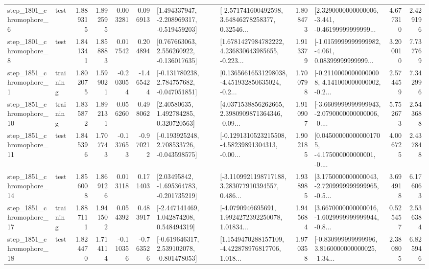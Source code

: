 \begin{tabular}{llrrrrllrlrr}
  step\_1801\_chromophore\_6 &      test &      1.889315 &    1.892595 &      0.003281 &  0.096913 &   [1.494337947, -2.208969317, -0.519459203] &  [-2.571741600492598, 3.64846278258377, 0.32546... &       1.808473 &  [2.3290000000000006, -3.441, -0.46199999999999... &            4.677310 &          2.429196 \\
  step\_1801\_chromophore\_8 &      test &      1.841341 &    1.858883 &      0.017542 &  0.204894 &    [0.767663063, 2.556260922, -0.136017635] &  [1.6781427984782222, 4.236830643985655, -0.223... &       1.913379 &  [-1.0159999999999982, -4.061, 0.08399999999999... &            3.200010 &          7.737769 \\
  step\_1851\_chromophore\_1 &  training &      1.802075 &    1.599021 &     -0.203054 & -1.465424 &   [-0.131780238, 2.784757682, -0.047051851] &  [0.13656616531298038, -4.451932850635024, -0.2... &       1.700798 &  [-0.21100000000000008, 4.141000000000002, -0.2... &            2.574459 &          7.342996 \\
 step\_1851\_chromophore\_10 &  training &      1.835872 &    1.892131 &      0.056260 &  0.498062 &      [2.40580635, 1.492784285, 0.320720563] &  [4.0371538856262665, 2.3980909871364346, -0.09... &       1.910907 &  [-3.6609999999999943, -2.0790000000000006, -0.... &            5.752673 &          2.543688 \\
 step\_1851\_chromophore\_11 &      test &      1.845396 &    1.707743 &     -0.137653 & -0.970212 &   [-0.193925248, 2.708533726, -0.043598575] &  [-0.1291310523215508, -4.58239891304313, -0.00... &       1.902185 &  [0.045000000000001705, -4.175000000000001, -0.... &            4.006725 &          2.437848 \\
 step\_1851\_chromophore\_14 &      test &      1.856008 &    1.869126 &      0.013118 &  0.171403 &    [2.03495842, -1.695364783, -0.201735219] &  [-3.1109921198717188, 3.283077910394557, 0.486... &       1.938985 &  [3.1750000000000043, -2.7209999999999965, -0.5... &            3.694918 &          6.176063 \\
 step\_1851\_chromophore\_17 &  training &      1.887111 &    1.941502 &      0.054392 &  0.483917 &    [-2.447141469, 1.042874208, 0.548494319] &  [-4.0790946695691, 1.9924272392250078, 1.01834... &       1.945684 &  [3.6670000000000016, -1.6029999999999944, -0.8... &            0.525457 &          2.536384 \\
 step\_1851\_chromophore\_18 &      test &      1.824470 &    1.714114 &     -0.110356 & -0.763526 &   [-0.619646317, 2.539102078, -0.801478053] &  [1.1549470288157109, -4.422878976817706, 1.018... &       1.970358 &  [-0.830999999999996, 3.8160000000000025, -1.34... &            2.380805 &          6.825946 \\

\end{tabular}
